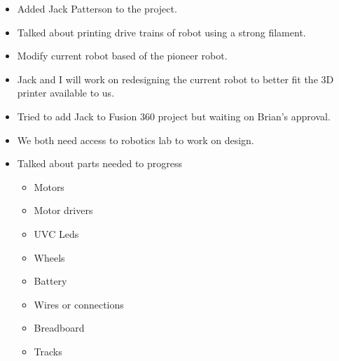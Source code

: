 \documentclass[fontsize=11pt, %
                             paper=a4, %
                             twoside, %
                             captions=tableheading,
                             index=totoc,
                             hyperref]{labbook}
\begin{document}
\begin{addmargin}[0cm]{0cm}
\begin{itemize}
\item Added Jack Patterson to the project.
\item Talked about printing drive trains of robot using a strong filament.
\end{itemize}
\begin{itemize}
\item Modify current robot based of the pioneer robot.
\item Jack and I will work on redesigning the current robot to better fit the 3D printer available to us.
\end{itemize}

\begin{itemize}
\item Tried to add Jack to Fusion 360 project but waiting on Brian's approval.
\item We both need access to robotics lab to work on design.
\item Talked about parts needed to progress
\begin{itemize}
\item Motors
\item Motor drivers
\item UVC Leds
\item Wheels
\item Battery
\item Wires or connections
\item Breadboard
\item Tracks
\end{itemize}
\end{itemize}

\end{addmargin} 





\end{document}
